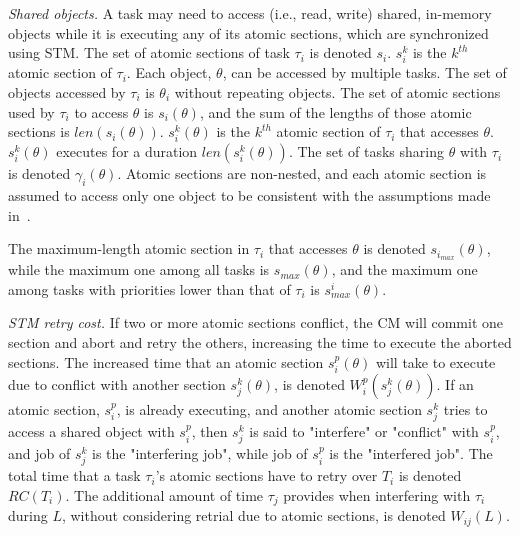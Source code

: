 \documentclass[conference]{IEEEtran}
\begin{document}
\textit{Shared objects.} A task may need to access (i.e., read, write) shared, in-memory objects while it is executing any of its atomic sections, which are synchronized using STM. 
The set of atomic sections of task $\tau_i$ is denoted $s_i$. $s_i^k$ is the $k^{th}$ atomic section of $\tau_i$. 
Each object, $\theta$, can be accessed by multiple tasks. The set of objects accessed by $\tau_i$ is $\theta_i$ without repeating objects.
The set of atomic sections used by $\tau_i$ to access $\theta$ is $s_i(\theta)$, and the sum of the lengths of those atomic sections is $len(s_i(\theta))$. $s_i^k(\theta)$ is the $k^{th}$ atomic section of $\tau_i$ that accesses $\theta$. $s_i^k(\theta)$  executes for a duration $len(s_i^k(\theta))$.
The set of tasks sharing $\theta$ with $\tau_i$ is denoted $\gamma_i(\theta)$. Atomic sections are non-nested, and each atomic section is assumed to access only one object to be consistent with the assumptions made in~\cite{stmconcurrencycontrol:emsoft11}.%

The maximum-length atomic section in $\tau_i$ that accesses $\theta$ is denoted $s_{i_{max}} (\theta)$, while the maximum one among all tasks is $s_{max} (\theta)$, and the maximum one among tasks with priorities lower than that of $\tau_i$ is $s_{max}^i (\theta)$.

\textit{STM retry cost.} If two or more atomic sections conflict, the CM will commit one section and abort and retry the others, increasing the time to execute the aborted sections. The increased time that an atomic section $s_i^p (\theta)$ will take to execute due to conflict with another section $s_j^k (\theta)$, is denoted $W_{i}^{p}(s_{j}^{k}(\theta))$. If an atomic section, $s_i^p$, is already executing, and another atomic section $s_j^k$ tries to access a shared object with $s_i^p$, then $s_j^k$ is said to "interfere" or "conflict" with $s_i^p$, and job of $s_j^k$ is the "interfering job", while job of $s_i^p$ is the "interfered job". The total time that a task $\tau_i$'s atomic sections have to retry over $T_i$ is denoted $RC(T_i)$.
The additional amount of time $\tau_j$ provides when interfering with $\tau_i$ during $L$, without considering retrial due to atomic sections, is denoted $W_{ij}(L)$.
\end{document}
